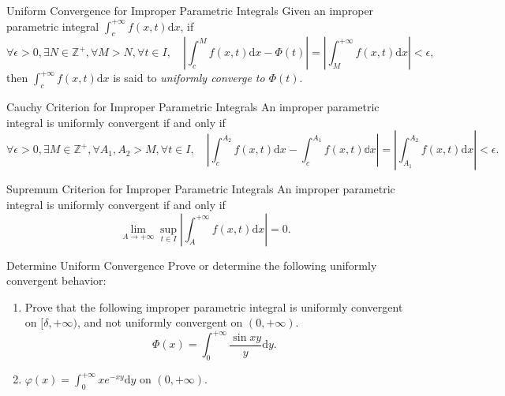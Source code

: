 \begin{definition}{Uniform Convergence for Improper Parametric Integrals}{}
  Given an improper parametric integral $\int_c^{+\infty}f(x, t)\mathrm{d} x$, if
  \begin{equation}
    \forall \epsilon > 0, \exists N \in \mathbb{Z}^+, \forall M > N, \forall t \in I, \quad
    \left| \int_c^M f(x, t)\mathrm{d} x - \Phi(t) \right| = 
    \left| \int_M^{+\infty} f(x, t)\mathrm{d} x \right| < \epsilon,
  \end{equation}
  then $\int_c^{+\infty}f(x, t)\mathrm{d} x$ is said to \emph{uniformly converge
  to $\Phi(t)$}.
\end{definition}

\begin{proposition}{Cauchy Criterion for Improper Parametric Integrals}{}
  An improper parametric integral is uniformly convergent if and only if
  \begin{equation}
    \forall \epsilon > 0, \exists M \in \mathbb{Z}^+,
    \forall A_1, A_2 > M, \forall t \in I, \quad
    \left| \int_c^{A_2}f(x,t)\mathrm{d}x - \int_c^{A_1}f(x,t)\mathbb{d}x \right| = 
    \left| \int_{A_1}^{A_2}f(x,t)\mathrm{d}x \right| < \epsilon.
  \end{equation}
\end{proposition}

\begin{proposition}{Supremum Criterion for Improper Parametric Integrals}{}
  An improper parametric integral is uniformly convergent if and only if
  \begin{equation}
    \lim \limits _{A \rightarrow +\infty} \sup \limits_{t \in I}
    \left| \int_A^{+\infty} f(x,t)\mathrm{d} x  \right| = 0.
  \end{equation}
\end{proposition}

\begin{example}{Determine Uniform Convergence}{}
  Prove or determine the following uniformly convergent behavior:
  \begin{enumerate}
  \item Prove that the following improper parametric integral is
    uniformly convergent on $[\delta, +\infty)$, and not uniformly convergent
    on $(0, +\infty)$.
    \begin{equation}
      \Phi(x) = \int_0^{+\infty} \frac{\sin xy}{y} \mathrm{d} y.
    \end{equation}
  \item $\varphi(x) = \int_0^{+\infty} xe^{-xy}\mathrm{d} y$ on $(0, +\infty)$.
  \end{enumerate}
\end{example}

